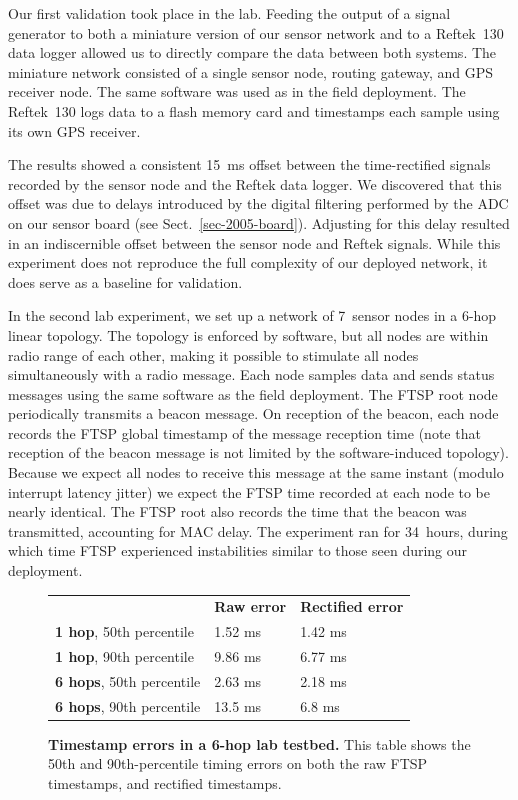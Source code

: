Our first validation took place in the lab. Feeding the output of a signal
generator to both a miniature version of our sensor network and to a
Reftek~130 data logger allowed us to directly compare the data between both
systems.  The miniature network consisted of a single sensor node, routing
gateway, and GPS receiver node. The same software was used as in the field
deployment. The Reftek~130 logs data to a flash memory card and timestamps
each sample using its own GPS receiver.

The results showed a consistent 15~ms offset between the time-rectified
signals recorded by the sensor node and the Reftek data logger.  We
discovered that this offset was due to delays introduced by the digital
filtering performed by the ADC on our sensor board (see
Sect.~\ref{sec-2005-board}). Adjusting for this delay resulted in an
indiscernible offset between the sensor node and Reftek signals. While this
experiment does not reproduce the full complexity of our deployed network, it
does serve as a baseline for validation.

In the second lab experiment, we set up a network of 7~sensor nodes in a
6-hop linear topology. The topology is enforced by software, but all nodes
are within radio range of each other, making it possible to stimulate all
nodes simultaneously with a radio message.  Each node samples data and sends
status messages using the same software as the field deployment. The FTSP
root node periodically transmits a beacon message. On reception of the
beacon, each node records the FTSP global timestamp of the message reception
time (note that reception of the beacon message is not limited by the
software-induced topology).  Because we expect all nodes to receive this
message at the same instant (modulo interrupt latency jitter) we expect the
FTSP time recorded at each node to be nearly identical. The FTSP root also
records the time that the beacon was transmitted, accounting for MAC delay.
The experiment ran for 34~hours, during which time FTSP experienced
instabilities similar to those seen during our deployment.

\begin{figure}
\caption{{\bf Timestamp errors in a 6-hop lab testbed.}
This table shows the 50th and 90th-percentile timing errors on both the raw
FTSP timestamps, and rectified timestamps.}
\vspace{0.2in}
\begin{center}
\begin{tabular}{lll}
\noalign{\smallskip}
                  & {\bf Raw error} & {\bf Rectified error} \\
\noalign{\smallskip}\svhline\noalign{\smallskip}
{\bf  1 hop}, 50th percentile & 1.52 ms & 1.42 ms \\ 
{\bf 1 hop}, 90th percentile & 9.86 ms & 6.77 ms \\
\noalign{\smallskip}\svhline\noalign{\smallskip}
{\bf 6 hops}, 50th percentile & 2.63 ms & 2.18 ms \\ 
{\bf 6 hops}, 90th percentile & 13.5 ms & 6.8 ms \\
\end{tabular}
\label{fig-time-rect-lab}
\end{center}
\end{figure}

